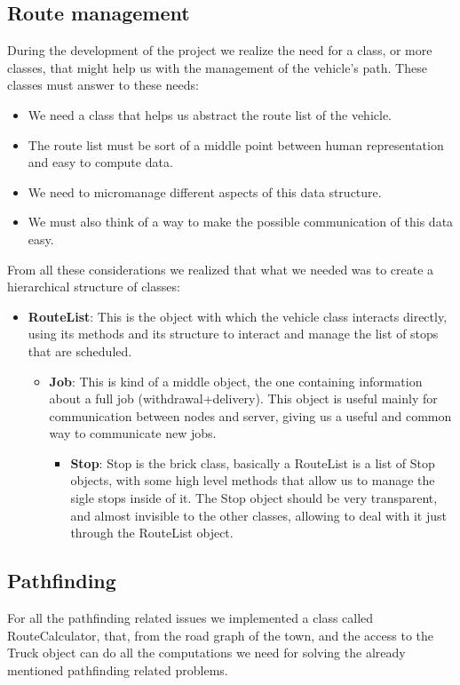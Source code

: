 \documentclass[titlepage]{article}
\begin{document}
\subsection{Route management}
During the development of the project we realize the need for a class, or more classes, that might help us with the management of the vehicle's path. These classes must answer to these needs:
\begin{itemize}
    \item We need a class that helps us abstract the route list of the vehicle.
    \item The route list must be sort of a middle point between human representation and easy to compute data.
    \item We need to micromanage different aspects of this data structure.
    \item We must also think of a way to make the possible communication of this data easy.
\end{itemize}

From all these considerations we realized that what we needed was to create a hierarchical structure of classes:

\begin{itemize}
    \item \textbf{RouteList}: This is the object with which the vehicle class interacts directly, using its methods and its structure to interact and manage the list of stops that are scheduled.
    \begin{itemize}
        \item \textbf{Job}: This is kind of a middle object, the one containing information about a full job (withdrawal+delivery). This object is useful mainly for communication between nodes and server, giving us a useful and common way to communicate new jobs.
        \begin{itemize}
            \item \textbf{Stop}: Stop is the brick class, basically a RouteList is a list of Stop objects, with some high level methods that allow us to manage the sigle stops inside of it. The Stop object should be very transparent, and almost invisible to the other classes, allowing to deal with it just through the RouteList object.
        \end{itemize}
    \end{itemize}
\end{itemize}

\subsection{Pathfinding}
For all the pathfinding related issues we implemented a class called RouteCalculator, that, from the road graph of the town, and the access to the Truck object can do all the computations we need for solving the already mentioned pathfinding related problems.
\end{document}
